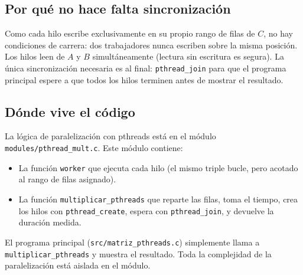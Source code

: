 \subsection{Por qué no hace falta sincronización}

Como cada hilo escribe exclusivamente en su propio rango de filas de $C$, no hay condiciones de carrera: dos trabajadores nunca escriben sobre la misma posición. Los hilos leen de $A$ y $B$ simultáneamente (lectura sin escritura es segura). La única sincronización necesaria es al final: \texttt{pthread\_join} para que el programa principal espere a que todos los hilos terminen antes de mostrar el resultado.

\subsection{Dónde vive el código}

La lógica de paralelización con pthreads está en el módulo \texttt{modules/pthread\_mult.c}. Este módulo contiene:
\begin{itemize}
    \item La función \texttt{worker} que ejecuta cada hilo (el mismo triple bucle, pero acotado al rango de filas asignado).
    \item La función \texttt{multiplicar\_pthreads} que reparte las filas, toma el tiempo, crea los hilos con \texttt{pthread\_create}, espera con \texttt{pthread\_join}, y devuelve la duración medida.
\end{itemize}

El programa principal (\texttt{src/matriz\_pthreads.c}) simplemente llama a \texttt{multiplicar\_pthreads} y muestra el resultado. Toda la complejidad de la paralelización está aislada en el módulo.